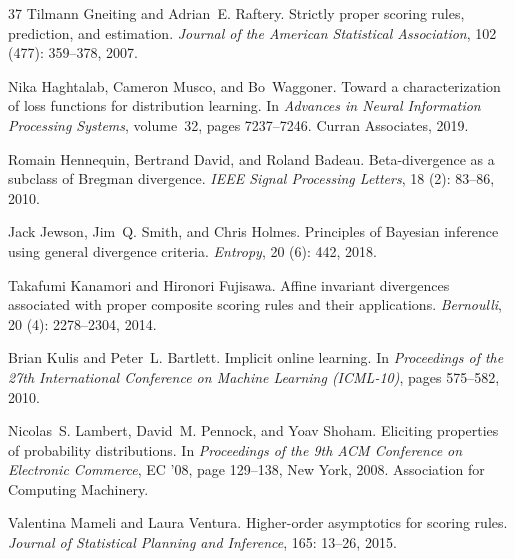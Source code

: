 \documentclass[11pt,oneside,a4paper]{article}
\theoremstyle{plain}
\theoremstyle{definition}
\theoremstyle{remark}
\begin{document}
\begin{thebibliography}{37}
Tilmann Gneiting and Adrian~E. Raftery.
\newblock Strictly proper scoring rules, prediction, and estimation.
\newblock \emph{Journal of the American Statistical Association}, 102 (477): 359--378, 2007.

Nika Haghtalab, Cameron Musco, and Bo~Waggoner.
\newblock Toward a characterization of loss functions for distribution learning.
\newblock In \emph{Advances in Neural Information Processing Systems}, volume~32, pages 7237--7246. Curran Associates, 2019.

Romain Hennequin, Bertrand David, and Roland Badeau.
\newblock Beta-divergence as a subclass of {B}regman divergence.
\newblock \emph{IEEE Signal Processing Letters}, 18 (2): 83--86, 2010.

Jack Jewson, Jim~Q. Smith, and Chris Holmes.
\newblock Principles of {B}ayesian inference using general divergence criteria.
\newblock \emph{Entropy}, 20 (6): 442, 2018.

Takafumi Kanamori and Hironori Fujisawa.
\newblock Affine invariant divergences associated with proper composite scoring rules and their applications.
\newblock \emph{Bernoulli}, 20 (4): 2278--2304, 2014.

Brian Kulis and Peter~L. Bartlett.
\newblock Implicit online learning.
\newblock In \emph{Proceedings of the 27th International Conference on Machine Learning (ICML-10)}, pages 575--582, 2010.

Nicolas~S. Lambert, David~M. Pennock, and Yoav Shoham.
\newblock Eliciting properties of probability distributions.
\newblock In \emph{Proceedings of the 9th ACM Conference on Electronic Commerce}, EC '08, page 129–138, New York, 2008. Association for Computing Machinery.

Valentina Mameli and Laura Ventura.
\newblock Higher-order asymptotics for scoring rules.
\newblock \emph{Journal of Statistical Planning and Inference}, 165: 13--26, 2015.


\end{thebibliography}
\end{document}
